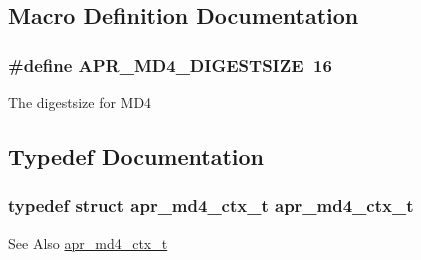 \subsection{Macro Definition Documentation}
\hypertarget{group___a_p_r___util___m_d4_ga84489272090a11902d831c288c81c20f}{
\subsubsection[{A\-P\-R\-\_\-\-M\-D4\-\_\-\-D\-I\-G\-E\-S\-T\-S\-I\-Z\-E}]{\setlength{\rightskip}{0pt plus 5cm}\#define A\-P\-R\-\_\-\-M\-D4\-\_\-\-D\-I\-G\-E\-S\-T\-S\-I\-Z\-E~16}}\label{group___a_p_r___util___m_d4_ga84489272090a11902d831c288c81c20f}
The digestsize for M\-D4 

\subsection{Typedef Documentation}
\hypertarget{group___a_p_r___util___m_d4_ga273e0d8ad064dba908e46bde074af0d8}{
\subsubsection[{apr\-\_\-md4\-\_\-ctx\-\_\-t}]{\setlength{\rightskip}{0pt plus 5cm}typedef struct {\bf apr\-\_\-md4\-\_\-ctx\-\_\-t} {\bf apr\-\_\-md4\-\_\-ctx\-\_\-t}}}\label{group___a_p_r___util___m_d4_ga273e0d8ad064dba908e46bde074af0d8}
\begin{DoxySeeAlso}{See Also}
\hyperlink{structapr__md4__ctx__t}{apr\-\_\-md4\-\_\-ctx\-\_\-t} 
\end{DoxySeeAlso}


